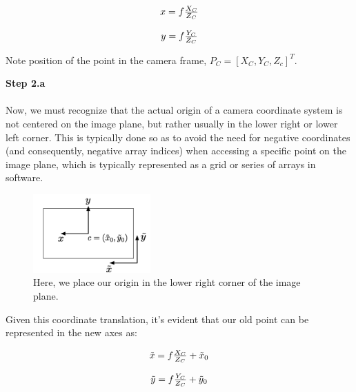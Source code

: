 \documentclass[]{article}
\begin{document}
\begin{center}
\begin{equation}
\begin{tabular}{c}
  $x = f\frac{X_C}{Z_C}$\\
  \\
  $y = f\frac{Y_C}{Z_C}$
\end{tabular}
\end{equation}
\end{center}

Note position of the point in the camera frame, $P_C = [X_C,  Y_C,  Z_c]^T$.

\textbf{Step 2.a}\\\\
Now, we must recognize that the actual origin of a camera coordinate system is not centered on the image plane, but rather usually in the lower right or lower left corner. This is typically done so as to avoid the need for negative coordinates (and consequently, negative array indices) when accessing a specific point on the image plane, which is typically represented as a grid or series of arrays in software.

\begin{figure}[H]
\includegraphics[width=0.4\textwidth]{vik_image_2.png}
\centering
\caption{Here, we place our origin in the lower right corner of the image plane. }
\label{fig:camera_coordinates}
\end{figure}

Given this coordinate translation, it's evident that our old point can be represented in the new axes as:

\begin{center}
\begin{equation}
\begin{tabular}{c}
  $\tilde{x} = f\frac{X_C}{Z_C} + \tilde{x}_0$\\
  \\
  $\tilde{y} = f\frac{Y_C}{Z_C} + \tilde{y}_0$
\end{tabular}
\end{equation}
\end{center}
\end{document}
